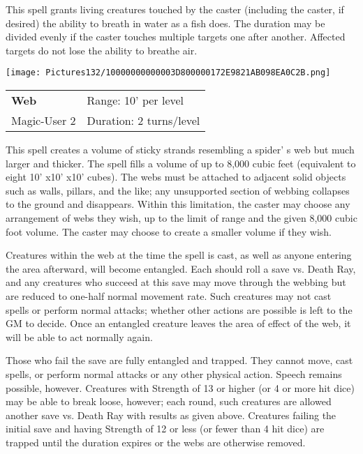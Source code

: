 \documentclass[a4paper,twoside,openany,10pt]{book}
\begin{document}
\begin{multicols}{2}
This spell grants living creatures touched by the caster (including the caster, if desired) the ability to breath in water as a fish does. The duration may be divided evenly if the caster touches multiple targets one after another. Affected targets do not lose the ability to breathe air.

\medskip

\begin{flushleft}
\texttt{[image: Pictures132/10000000000003D800000172E9821AB098EA0C2B.png]}
\end{flushleft}

\smallskip\begin{flushleft} 
	\begin{tabularx}{0.45\textwidth}{@{}m{3.5cm}m{5.5cm}@{}} 
		\textbf{Web} & Range: 10' per level\\
		Magic-User 2 &Duration: 2 turns/level\\
	\end{tabularx}\end{flushleft}

This spell creates a volume of sticky strands resembling a spider' s web but much larger and thicker. The spell fills a volume of up to 8,000 cubic feet (equivalent to eight 10' x10' x10' cubes). The webs must be attached to adjacent solid objects such as walls, pillars, and the like; any unsupported section of webbing collapses to the ground and disappears. Within this limitation, the caster may choose any arrangement of webs they wish, up to the limit of range and the given 8,000 cubic foot volume. The caster may choose to create a smaller volume if they wish.

Creatures within the web at the time the spell is cast, as well as anyone entering the area afterward, will become entangled. Each should roll a save vs. Death Ray, and any creatures who succeed at this save may move through the webbing but are reduced to one-half normal movement rate. Such creatures may not cast spells or perform normal attacks; whether other actions are possible is left to the GM to decide. Once an entangled creature leaves the area of effect of the web, it will be able to act normally again.

Those who fail the save are fully entangled and trapped. They cannot move, cast spells, or perform normal attacks or any other physical action. Speech remains possible, however. Creatures with Strength of 13 or higher (or 4 or more hit dice) may be able to break loose, however; each round, such creatures are allowed another save vs. Death Ray with results as given above. Creatures failing the initial save and having Strength of 12 or less (or fewer than 4 hit dice) are trapped until the duration expires or the webs are otherwise removed.


\end{multicols}
\end{document}
